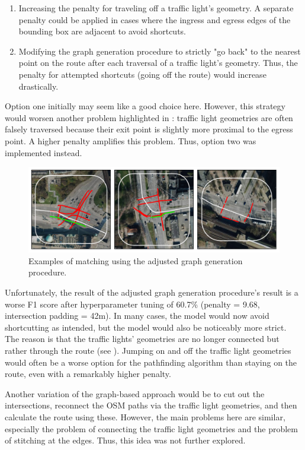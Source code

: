 \begin{enumerate}
    \item Increasing the penalty for traveling off a traffic light's geometry. A separate penalty could be applied in cases where the ingress and egress edges of the bounding box are adjacent to avoid shortcuts.
    \item  Modifying the graph generation procedure to strictly "go back" to the nearest point on the route after each traversal of a traffic light's geometry. Thus, the penalty for attempted shortcuts (going off the route) would increase drastically.
\end{enumerate}

Option one initially may seem like a good choice here. However, this strategy would worsen another problem highlighted in : traffic light geometries are often falsely traversed because their exit point is slightly more proximal to the egress point. A higher penalty amplifies this problem. Thus, option two was implemented instead. 

\begin{figure}[t]
\centering
\includegraphics[width=\linewidth]{images/matching-dijkstra-strict.pdf}
\caption{Examples of matching using the adjusted graph generation procedure.}
\label{fig:sg-selection-graph-strict}
\end{figure}

Unfortunately, the result of the adjusted graph generation procedure's result is a worse F1 score after hyperparameter tuning of 60.7\% (penalty = 9.68, intersection padding = 42m). In many cases, the model would now avoid shortcutting as intended, but the model would also be noticeably more strict. The reason is that the traffic lights' geometries are no longer connected but rather through the route (see ). Jumping on and off the traffic light geometries would often be a worse option for the pathfinding algorithm than staying on the route, even with a remarkably higher penalty. 

Another variation of the graph-based approach would be to cut out the intersections, reconnect the OSM paths via the traffic light geometries, and then calculate the route using these. However, the main problems here are similar, especially the problem of connecting the traffic light geometries and the problem of stitching at the edges. Thus, this idea was not further explored.


